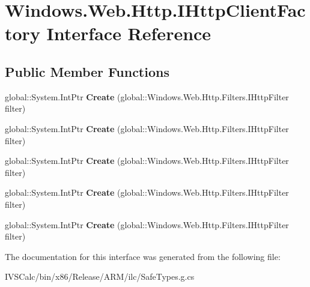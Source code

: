 \hypertarget{interface_windows_1_1_web_1_1_http_1_1_i_http_client_factory}{}\section{Windows.\+Web.\+Http.\+I\+Http\+Client\+Factory Interface Reference}
\label{interface_windows_1_1_web_1_1_http_1_1_i_http_client_factory}
\subsection*{Public Member Functions}
\begin{DoxyCompactItemize}
\item 
\mbox{\label{interface_windows_1_1_web_1_1_http_1_1_i_http_client_factory_a9fcd1bc1dd2ebc7dfdf8064d8af75de2}} 
global\+::\+System.\+Int\+Ptr {\bfseries Create} (global\+::\+Windows.\+Web.\+Http.\+Filters.\+I\+Http\+Filter filter)
\item 
\mbox{\label{interface_windows_1_1_web_1_1_http_1_1_i_http_client_factory_a9fcd1bc1dd2ebc7dfdf8064d8af75de2}} 
global\+::\+System.\+Int\+Ptr {\bfseries Create} (global\+::\+Windows.\+Web.\+Http.\+Filters.\+I\+Http\+Filter filter)
\item 
\mbox{\label{interface_windows_1_1_web_1_1_http_1_1_i_http_client_factory_a9fcd1bc1dd2ebc7dfdf8064d8af75de2}} 
global\+::\+System.\+Int\+Ptr {\bfseries Create} (global\+::\+Windows.\+Web.\+Http.\+Filters.\+I\+Http\+Filter filter)
\item 
\mbox{\label{interface_windows_1_1_web_1_1_http_1_1_i_http_client_factory_a9fcd1bc1dd2ebc7dfdf8064d8af75de2}} 
global\+::\+System.\+Int\+Ptr {\bfseries Create} (global\+::\+Windows.\+Web.\+Http.\+Filters.\+I\+Http\+Filter filter)
\item 
\mbox{\label{interface_windows_1_1_web_1_1_http_1_1_i_http_client_factory_a9fcd1bc1dd2ebc7dfdf8064d8af75de2}} 
global\+::\+System.\+Int\+Ptr {\bfseries Create} (global\+::\+Windows.\+Web.\+Http.\+Filters.\+I\+Http\+Filter filter)
\end{DoxyCompactItemize}


The documentation for this interface was generated from the following file\+:\begin{DoxyCompactItemize}
\item 
I\+V\+S\+Calc/bin/x86/\+Release/\+A\+R\+M/ilc/Safe\+Types.\+g.\+cs\end{DoxyCompactItemize}
